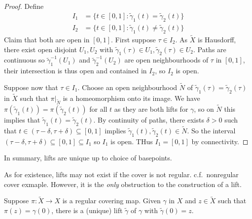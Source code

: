 \documentclass[a4paper]{article}
\begin{document}
\begin{proof}
  Define
  \begin{align*}
    I_1 &= \{t \in [0, 1]: \tilde \gamma_1(t) = \tilde \gamma_2(t)\} \\
    I_2 &= \{t \in [0, 1]: \tilde \gamma_1(t) \neq \tilde \gamma_2(t)\}
  \end{align*}
  Claim that both are open in \([0, 1]\). First suppose \(\tau \in I_2\). As \(\tilde X\) is Hausdorff, there exist open disjoint \(U_1, U_2\) with \(\tilde \gamma_1(\tau) \in U_1, \tilde \gamma_2(\tau) \in U_2\). Paths are continuous so \(\tilde \gamma_1^{-1}(U_1)\) and \(\tilde \gamma_2^{-1}(U_2)\) are open neighbourhoods of \(\tau\) in \([0, 1]\), their intersection is thus open and contained in \(I_2\), so \(I_2\) is open.

  Suppose now that \(\tau \in I_1\). Choose an open neighbourhood \(\tilde N\) of \(\tilde \gamma_1(\tau) = \tilde \gamma_2(\tau)\) in \(\tilde X\) such that \(\pi|_{\tilde N}\) is a homeomorphism onto its image. We have \(\pi(\tilde \gamma_1(t)) = \pi(\tilde \gamma_2(t))\) for all \(t\) as they are both lifts for \(\gamma\), so on \(\tilde N\) this implies that \(\tilde \gamma_1(t) = \tilde \gamma_2(t)\). By continuity of paths, there exists \(\delta > 0\) such that \(t \in (\tau - \delta, \tau + \delta) \subseteq [0, 1]\) implies \(\tilde \gamma_1(t), \tilde \gamma_2(t) \in \tilde N\). So the interval \((\tau - \delta, \tau + \delta) \subseteq [0, 1] \subseteq I_1\) so \(I_1\) is open. THus \(I_1 = [0, 1]\) by connectivity.
\end{proof}

In summary, lifts are unique up to choice of basepoints.

As for existence, lifts may not exist if the cover is not regular. c.f.\ nonregular cover exmaple. However, it is the \emph{only} obstruction to the construction of a lift.

\begin{proposition}
  Suppose \(\pi: \tilde X \to X\) is a regular covering map. Given \(\gamma\) in \(X\) and \(z \in \tilde X\) such that \(\pi(z) = \gamma(0)\), there is a (unique) lift \(\tilde \gamma\) of \(\gamma\) with \(\tilde \gamma(0) = z\).
\end{proposition}
\end{document}
